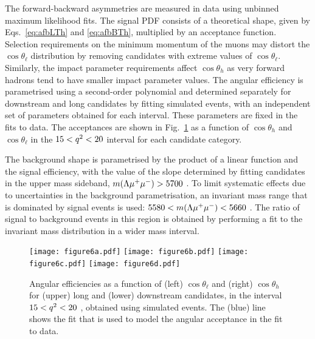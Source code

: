 The forward-backward asymmetries are measured in data using unbinned
maximum likelihood fits.  The signal PDF consists of a theoretical
shape, given by Eqs.~\ref{eq:afbLTh} and \ref{eq:afbBTh}, multiplied
by an acceptance function.  Selection requirements on the minimum
momentum of the muons may distort the $\cos \theta_\ell$ distribution
by removing candidates with extreme values of $\cos
\theta_\ell$. Similarly, the impact parameter requirements affect
$\cos \theta_h$ as very forward hadrons tend to have smaller impact
parameter values.  The angular efficiency is parametrised using a
second-order polynomial and determined separately for downstream and
long candidates by fitting simulated events, with an independent set
of parameters obtained for each \qsq interval. These parameters are
fixed in the fits to data.  The acceptances are shown in
Fig.~\ref{fig:AngEff} as a function of $\cos\theta_h$ and
$\cos\theta_\ell$ in the $15 < {q^2} <20$ \gevgevcccc interval for each
candidate category.

The background shape is parametrised by the product of a linear
function and the signal efficiency, with the value of the slope
determined by fitting candidates in the upper mass sideband,
$m({\Lambda}{\mu^+\mu^-}) > 5700$ \mevcc.  To limit systematic effects due to
uncertainties in the background parametrisation, an invariant mass
range that is dominated by signal events is used: $5580 < m({\Lambda}{\mu^+\mu^-})
< 5660 $ \mevcc.  The ratio of signal to background events in this
region is obtained by performing a fit to the invariant mass
distribution in a wider mass interval.
\begin{figure}[tbp]
\centering
\texttt{[image: figure6a.pdf]}
\texttt{[image: figure6b.pdf]}
\texttt{[image: figure6c.pdf]}
\texttt{[image: figure6d.pdf]}

\caption{Angular efficiencies as a function of (left)
  $\cos\theta_\ell$ and (right) $\cos\theta_h$ for (upper) long and
  (lower) downstream candidates, in the interval $15 < {q^2} < 20$
  \gevgevcccc, obtained using simulated events.  The (blue) line shows
  the fit that is used to model the angular acceptance in the fit to
  data. }
\label{fig:AngEff}
\end{figure}


